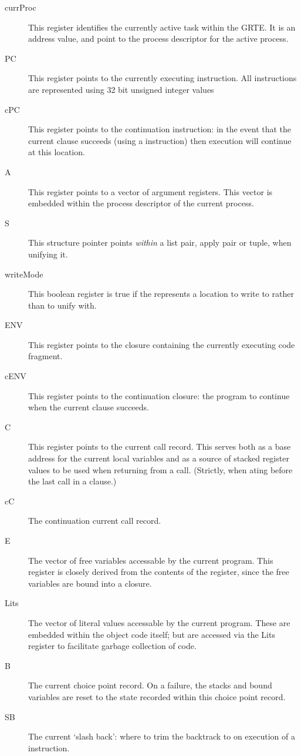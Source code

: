 \begin{description}
\item[currProc]
This register identifies the currently active task within the GRTE. It is an address value, and point to the process descriptor for the active process.
\item[PC]
This register points to the currently executing instruction. All instructions are represented using 32 bit unsigned integer values
\item[cPC]
This register points to the continuation instruction: in the event that the current clause succeeds (using a  instruction) then execution will continue at this location.
\item[A]
This register points to a vector of argument registers. This vector is embedded within the process descriptor of the current process.
\item[S]
This structure pointer points \emph{within} a list pair, apply pair or tuple, when unifying it.
\item[writeMode]
This boolean register is true if the  represents a location to write to rather than to unify with.
\item[ENV]
This register points to the closure containing the currently executing code fragment.
\item[cENV]
This register points to the continuation closure: the program to continue when the current clause succeeds.
\item[C]
This register points to the current call record. This serves both as a base address for the current local variables and as a source of stacked register values to be used when returning from a call. (Strictly, when ating before the last call in a clause.)
\item[cC]
The continuation current call record.
\item[E]
The vector of free variables accessable by the current program. This register is closely derived from the contents of the  register, since the free variables are bound into a closure.
\item[Lits]
The vector of literal values accessable by the current program. These are embedded within the object code itself; but are accessed via the Lits register to facilitate garbage collection of code.
\item[B]
The current choice point record. On a failure, the stacks and bound variables are reset to the state recorded within this choice point record.
\item[SB]
The current `slash back': where to trim the backtrack to on execution of a  instruction.

\end{description}
